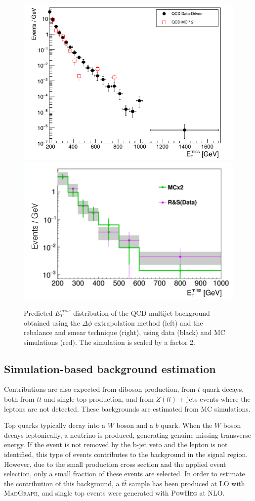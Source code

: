\begin{figure}[ht]
  \centering
 \includegraphics[width=.46\textwidth]{QCD_prediction.png} 
 \includegraphics[width=.52\textwidth]{rebalanceandsmear.png} 
 \caption{Predicted $E_T^{miss}$ distribution of the QCD multijet background obtained using the $\Delta\phi$ extrapolation method (left) and the rebalance and smear technique (right), using data (black) and MC simulations (red). The simulation is scaled by a factor 2.}
 \label{fig:QCD_prediction}
\end{figure}


\subsection{Simulation-based background estimation}

Contributions are also expected from diboson production, from $t$ quark decays, both from $t\bar{t}$ and single top production, and from $Z(ll)$ + jets events where the leptons are not detected. These backgrounds are estimated from MC simulations. 

Top quarks typically decay into a $W$ boson and a $b$ quark. When the $W$ boson decays leptonically, a neutrino is produced, generating genuine missing transverse energy. If the event is not removed by the b-jet veto and the lepton is not identified, this type of events contributes to the background in the signal region. However, due to the small production cross section and the applied event selection, only a small fraction of these events are selected. In order to estimate the contribution of this background, a $t\bar{t}$ sample has been produced at \ac{LO} with \textsc{MadGraph}, and single top events were generated with \textsc{PowHeg} at \ac{NLO}.

